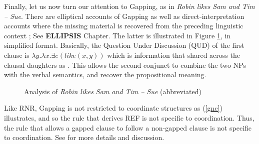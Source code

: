 \documentclass[output=paper]{langsci/langscibook}
\begin{document}
Finally, let us now turn our attention to Gapping, as in 
{\it Robin likes Sam and Tim -- Sue}.
There are elliptical accounts of Gapping  \citep{chaves06} as well as direct-interpretation accounts where the missing material is recovered from the preceding linguistic context  \citep{mouret, Mouret:06,Abeille:Blbie:Mouret:14,sangheepark}; See {\bf ELLIPSIS} Chapter. The latter is illustrated in Figure \ref{gfig}, in simplified format. Basically, the Question Under Discussion (QUD) of the first clause is $\lambda y.\lambda x. \exists e(like(x,y))$ which is information that shared across the clausal daughters as .
This allows the second conjunct to combine the two NPs with the verbal semantics, and recover the propositional meaning.

\begin{figure}[ht]
    \centering
    \caption{Analysis of {\it Robin likes Sam and Tim -- Sue} (abbreviated)}\label{gfig}
\end{figure}


Like RNR, Gapping is not restricted to coordinate structures as (\ref{gnc}) illustrates,
and so the rule that derives REF is not specific to coordination. Thus, the rule that allows a gapped clause to follow a non-gapped clause is not specific to coordination. See \citet{sangheepark} for more details and discussion.
\end{document}
